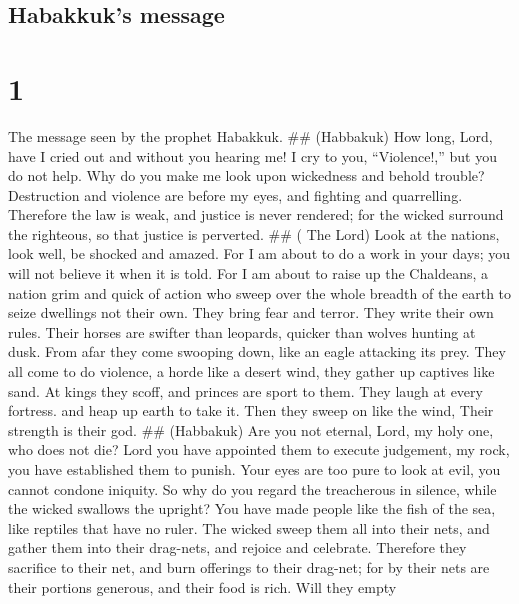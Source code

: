 \hypertarget{habakkuks-message}{%
\subsection{Habakkuk's message}\label{habakkuks-message}}

\hypertarget{section}{%
\section{1}\label{section}}

 The message seen by the prophet Habakkuk. \#\# (Habbakuk)
 How long, Lord, have I cried out and without you hearing
me! I cry to you, ``Violence!,'' but you do not help.  Why
do you make me look upon wickedness and behold trouble? Destruction and
violence are before my eyes, and fighting and quarrelling. 
Therefore the law is weak, and justice is never rendered; for the wicked
surround the righteous, so that justice is perverted. \#\# ( The Lord)
 Look at the nations, look well, be shocked and amazed. For
I am about to do a work in your days; you will not believe it when it is
told.  For I am about to raise up the Chaldeans, a nation
grim and quick of action who sweep over the whole breadth of the earth
to seize dwellings not their own.  They bring fear and
terror. They write their own rules.  Their horses are
swifter than leopards, quicker than wolves hunting at dusk. From afar
they come swooping down, like an eagle attacking its prey. 
They all come to do violence, a horde like a desert wind, they gather up
captives like sand.  At kings they scoff, and princes are
sport to them. They laugh at every fortress. and heap up earth to take
it.  Then they sweep on like the wind, Their strength is
their god. \#\# (Habbakuk)  Are you not eternal, Lord, my
holy one, who does not die? Lord you have appointed them to execute
judgement, my rock, you have established them to punish. 
Your eyes are too pure to look at evil, you cannot condone iniquity. So
why do you regard the treacherous in silence, while the wicked swallows
the upright?  You have made people like the fish of the
sea, like reptiles that have no ruler.  The wicked sweep
them all into their nets, and gather them into their drag-nets, and
rejoice and celebrate.  Therefore they sacrifice to their
net, and burn offerings to their drag-net; for by their nets are their
portions generous, and their food is rich.  Will they empty
